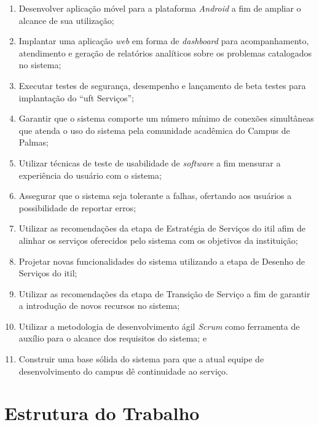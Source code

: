 \begin{enumerate}
    \item Desenvolver aplicação móvel para a plataforma \textit{Android} a fim de ampliar o alcance de sua utilização;
    \item Implantar uma aplicação \textit{web} em forma de \textit{dashboard} para acompanhamento, atendimento e geração de relatórios analíticos sobre os problemas catalogados no sistema;
    \item Executar testes de segurança, desempenho e lançamento de beta testes para implantação do ``\acrshort{uft} Serviços'';
    \item Garantir que o sistema comporte um número mínimo de conexões simultâneas que atenda o uso do sistema pela comunidade acadêmica do Campus de Palmas;
    \item Utilizar técnicas de teste de usabilidade de \textit{software} a fim mensurar a experiência do usuário com o sistema;
    \item Assegurar que o sistema seja tolerante a falhas, ofertando aos usuários a possibilidade de reportar erros;
    \item Utilizar as recomendações da etapa de Estratégia de Serviços do \gls{itil} afim de alinhar os serviços oferecidos pelo sistema com os objetivos da instituição;
    \item Projetar novas funcionalidades do sistema utilizando a etapa de Desenho de Serviços do \gls{itil};
    \item Utilizar as recomendações da etapa de Transição de Serviço a fim de garantir a introdução de novos recursos no sistema;
    \item Utilizar a metodologia de desenvolvimento ágil \textit{Scrum} como ferramenta de auxílio para o alcance dos requisitos do sistema; e
    \item Construir uma base sólida do sistema para que a atual equipe de desenvolvimento do campus dê continuidade ao serviço.
\end{enumerate}

\section{Estrutura do Trabalho}

